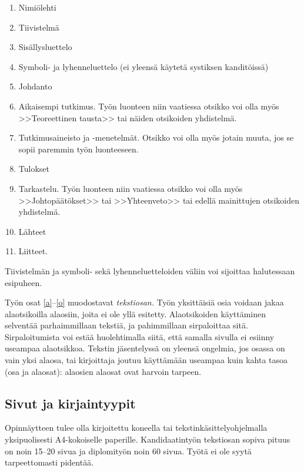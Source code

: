 \begin{enumerate}
\item Nimiölehti
\item Tiivistelmä
\item Sisällysluettelo
\item Symboli- ja lyhenneluettelo (ei yleensä käytetä systiksen kanditöissä)
\item \label{a} Johdanto
\item  Aikaisempi tutkimus. Työn luonteen niin vaatiessa otsikko voi olla myös
        >>Teoreettinen tausta>>  tai näiden otsikoiden yhdistelmä.
\item Tutkimusaineisto ja -menetelmät. Otsikko voi olla myös jotain muuta, jos se sopii paremmin työn luonteeseen. %
\item Tulokset
\item \label{o} Tarkastelu. Työn luonteen niin vaatiessa otsikko voi olla myös
		>>Johtopäätökset>> tai >>Yhteenveto>> tai edellä mainittujen otsikoiden
		yhdistelmä.
\item Lähteet
\item Liitteet.
\end{enumerate}

Tiivistelmän ja symboli- sekä lyhenneluetteloiden väliin voi sijoittaa
halutessaan esipuheen.  

Työn osat \ref{a}--\ref{o} muodostavat \textit{tekstiosan.}  Työn yksittäisiä
osia voidaan jakaa alaotsikoilla alaosiin, joita ei ole yllä esitetty. 
Alaotsikoiden käyttäminen selventää parhaimmillaan tekstiä, ja pahimmillaan 
sirpaloittaa sitä.  Sirpaloitumista voi estää huolehtimalla siitä, että samalla 
sivulla ei esiinny useampaa alaotsikkoa. Tekstin jäsentelyssä on yleensä 
ongelmia, jos osassa on vain yksi alaosa, tai kirjoittaja joutuu käyttämään 
useampaa kuin kahta tasoa (osa ja alaosat): alaosien alaosat ovat harvoin tarpeen.

\subsection{Sivut ja kirjaintyypit}

Opinnäytteen tulee olla kirjoitettu koneella tai
tekstinkäsittelyohjelmalla yksipuolisesti A4-kokoiselle paperille.
Kandidaatintyön tekstiosan sopiva pituus on noin 15--20 sivua ja
diplomityön noin 60 sivua. Työtä ei ole syytä tarpeettomasti pidentää.

